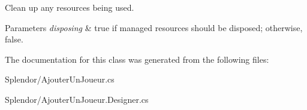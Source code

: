 Clean up any resources being used. 


\begin{DoxyParams}{Parameters}
{\em disposing} & true if managed resources should be disposed; otherwise, false.\\
\hline
\end{DoxyParams}


The documentation for this class was generated from the following files\+:\begin{DoxyCompactItemize}
\item 
Splendor/Ajouter\+Un\+Joueur.\+cs\item 
Splendor/Ajouter\+Un\+Joueur.\+Designer.\+cs\end{DoxyCompactItemize}
